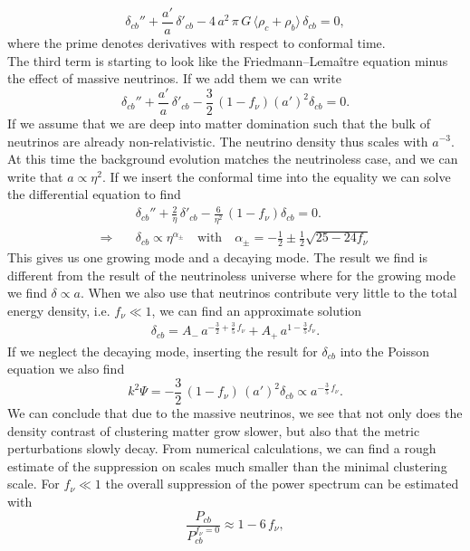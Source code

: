 \documentclass[../main.tex]{subfiles}
\begin{document}
\begin{equation}
    \delta_{cb}'' + \frac{a'}{a}\,\delta'_{cb} - 4\,a^2\,\pi\,G\,\langle \rho_c + \rho_b \rangle\, \delta_{cb} = 0,
\end{equation} 
where the prime denotes derivatives with respect to conformal time.\\
The third term is starting to look like the Friedmann–Lemaître equation minus the effect of massive neutrinos. If we add them we can write 
\begin{equation}
    \delta_{cb}'' + \frac{a'}{a}\,\delta'_{cb} - \frac{3}{2}\,(1-f_\nu)\left({a'}\right)^2 \delta_{cb} = 0.
\end{equation}
If we assume that we are deep into matter domination such that the bulk of neutrinos are already non-relativistic. The neutrino density thus scales with $a^{-3}$. At this time the background evolution matches the neutrinoless case, and we can write that $a\propto\eta^2$. If we insert the conformal time into the equality we can solve the differential equation to find \begin{align}
    &\delta_{cb}'' + \frac{2}{\eta}\,\delta'_{cb} - \frac{6}{\eta^2}\,(1-f_\nu) \delta_{cb} = 0.\\
    \Longrightarrow\quad&\delta_{cb} \propto \eta^{\alpha_\pm}\quad\text{with}\quad\alpha_\pm = -\frac{1}{2}\pm\frac{1}{2}\sqrt{25-24f_\nu}
\end{align}
This gives us one growing mode and a decaying mode. The result we find is different from the result of the neutrinoless universe where for the growing mode we find $\delta\propto a$. When we also use that neutrinos contribute very little to the total energy density, i.e. $f_\nu\ll 1$, we can find an approximate solution \begin{align}
    \delta_{cb} = A_-\,a^{-\frac{3}{2}+\frac{3}{5}\,f_\nu}+A_+\, a^{1-\frac{3}{5}f_\nu}.
\end{align}
If we neglect the decaying mode, inserting the result for $\delta_{cb}$ into the Poisson equation we also find 
\begin{equation}
k^2\Psi = -\frac{3}{2}\,(1-f_\nu)\,(a')^2\delta_{cb}\propto a^{-\frac{3}{5}\,f_\nu}.
\end{equation}
We can conclude that due to the massive neutrinos, we see that not only does the density contrast of clustering matter grow slower, but also that the metric perturbations slowly decay. From numerical calculations, we can find a rough estimate of the suppression on scales much smaller than the minimal clustering scale. For $f_\nu\ll1$ the overall suppression of the power spectrum  can be estimated with \begin{equation}
    \frac{P_{cb}}{P_{cb}^{f_\nu=0}} \approx 1- 6\,f_\nu,
\end{equation} 
\end{document}
